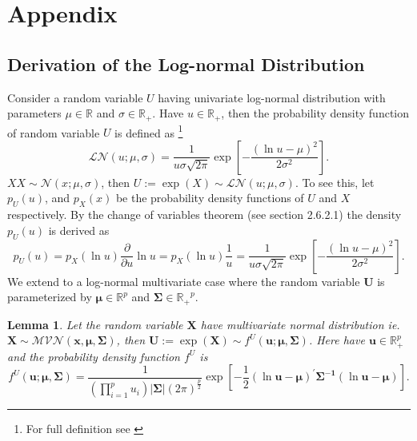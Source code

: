 \documentclass[11pt,letterpaper]{article}
\numberwithin{equation}{section}
\numberwithin{equation}{section}
\numberwithin{equation}{section}
\newtheorem{lemma}[theorem]{Lemma}
\begin{document}
\newpage
\section{Appendix}

\subsection{Derivation of the Log-normal Distribution }
Consider a random variable $U$ having univariate log-normal distribution with parameters $\mu \in \mathbb{R}$ and $\sigma \in \mathbb{R}_+ $. Have $u \in \mathbb{R}_+$, then the probability density function of random variable $U$ is defined as \footnote{For full definition see \cite{johnson1995continuous}}
$$\mathcal{LN}(u; \mu, \sigma) = \frac{1}{u\sigma\sqrt{2\pi}}\exp\left[-\frac{(\ln u - \mu)^2}{2\sigma^2}	\right].$$
$X$$ X \sim \mathcal{N}(x; \mu, \sigma) $, then $U := \exp{(X)}\sim \mathcal{LN}(u; \mu, \sigma) $.
To see this, let $p_U(u)$, and $ p_X(x) $ be the probability density functions of $U$ and $X$ respectively. By the change of variables theorem (see \cite{murphy2012machine} section 2.6.2.1) the density $p_U(u)$ is derived as
$$p_U(u) = p_X(\ln u )\frac{\partial}{\partial u} \ln u  =  p_X(\ln u ) \frac{1}{u} =  \frac{1}{u\sigma\sqrt{2\pi}}\exp\left[-\frac{(\ln u - \mu)^2}{2\sigma^2}	\right].$$\newline
 We extend to a log-normal multivariate case where the random variable $\bm{U} $ is parameterized by $ \bm{\mu} \in \mathbb{R}^p$ and $\bm{\Sigma} \in  \mathbb{R_{+}}^p \label{changeVarUni} $.
\begin{lemma}
Let the random variable $\bm{X}$ have multivariate normal distribution ie. $\bm{X} \sim \mathcal{MVN}(\bm{x}, \bm{\mu},\bm{\Sigma}) $, then $\bm{U} := \exp(\bm{X} ) \sim  f^U(\bm{u}; \bm{\mu } , \bm{\Sigma} )$. Here
have $\bm{u} \in \mathbb{R}_{+}^p $ and the probability density function $f^U$ is
$$ f^U(\bm{u}; \bm{\mu } , \bm{\Sigma} )= \frac{1}{(\prod_{i=1}^{p}u_{i})| \bm{\Sigma} |(2 \pi)^{\frac{p}{2}}}   \exp\left[-\frac{1}{2}(\ln \bm{u} -\bm{\mu})^{'}  \bm{\Sigma^{-1}}(\ln \bm{u} -\bm{\mu})\right].  $$
\end{lemma}
\end{document}
